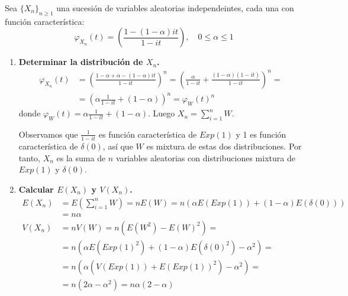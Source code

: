 \begin{exercise}
    Sea $\{X_n\}_{n \geq 1}$ una sucesión de variables aleatorias independeintes, cada una con función característica:
    $$\varphi_{X_n}(t) = \left(\frac{1 - (1-\alpha)it}{1-it}\right), \quad 0 \leq \alpha \leq 1$$

    \begin{enumerate}
        \item \textbf{Determinar la distribución de $X_n$.}
              \begin{align*}
                  \varphi_{X_n}(t) & = \left(\frac{1 - \alpha + \alpha - (1-\alpha)it}{1-it}\right)^n = \left(\frac{\alpha}{1-it} + \frac{(1-\alpha)(1-it)}{1-it}\right)^n = \\
                                   & = \left(\alpha\frac{1}{1-it} + (1-\alpha)\right)^n = \varphi_W(t)^n
              \end{align*}
              donde $\varphi_W(t) = \alpha\frac{1}{1-it} + (1-\alpha)$.
              Luego $X_n = \sum_{i=1}^n W$.

              Observamos que $\frac{1}{1-it}$ es función característica de $Exp(1)$ y 1 es función característica de $\delta(0)$, así que $W$ es mixtura de estas dos distribuciones.
              Por tanto, $X_n$ es la suma de $n$ variables aleatorias con distribuciones mixtura de $Exp(1)$ y $\delta(0)$.
        \item \textbf{Calcular $E(X_n)$ y $V(X_n)$.}
              \begin{align*}
                  E(X_n) & = E\left(\sum_{i=1}^n W\right) = nE(W) = n(\alpha E(Exp(1)) + (1-\alpha)E(\delta(0))) \\
                         & = n\alpha                                                                             \\
                  V(X_n) & = nV(W) = n(E(W^2) - E(W)^2) =                                                        \\
                         & = n(\alpha E(Exp(1)^2) + (1-\alpha)E(\delta(0)^2) - \alpha^2) =                       \\
                         & = n(\alpha(V(Exp(1)) + E(Exp(1))^2) - \alpha^2) =                                     \\
                         & = n(2\alpha - \alpha^2) = n\alpha(2-\alpha)
              \end{align*}


\end{enumerate}
\end{exercise}
